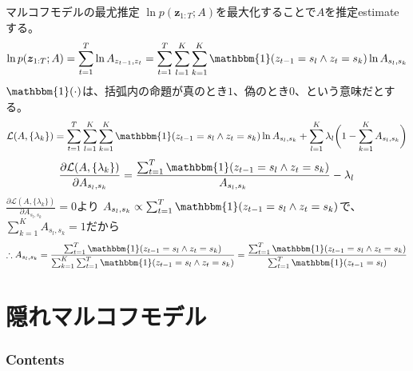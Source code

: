 \documentclass[aspectratio=169,unicode,dvipdfmx,14pt]{beamer}
\begin{document}
\begin{frame}{マルコフモデルの最尤推定}
\FontMath
$\ln p(\bm{z}_{1:T};A)$を最大化することで$A$を推定estimateする。
\begin{align}
\ln p(\bm{z}_{1:T};A) 
= \sum_{t=1}^T \ln A_{z_{t-1}, z_t}
= \sum_{t=1}^T \sum_{l=1}^K \sum_{k=1}^K \mathbbm{1}(z_{t-1}=s_l \wedge z_t=s_k) \ln A_{s_l,s_k}
\end{align}
$\mathbbm{1}(\cdot)$は、括弧内の命題が真のとき$1$、偽のとき$0$、という意味だとする。
\vspace{-0.05in}
\begin{align}
\mathcal{L}(A,\{ \lambda_k \}) = 
\sum_{t=1}^T \sum_{l=1}^K \sum_{k=1}^K \mathbbm{1}(z_{t-1}=s_l \wedge z_t=s_k) \ln A_{s_l,s_k}
+ \sum_{l=1}^K \lambda_l \bigg( 1 - \sum_{k=1}^K A_{s_l,s_k} \bigg) 
\end{align}
\vspace{-0.1in}
\begin{align}
\frac{\partial \mathcal{L}(A,\{ \lambda_k \})}{\partial A_{s_l,s_k}}
= \frac{ \sum_{t=1}^T \mathbbm{1}(z_{t-1}=s_l \wedge z_t=s_k) }{ A_{s_l,s_k} } - \lambda_l
\end{align}
$\frac{\partial \mathcal{L}(A,\{ \lambda_k \})}{\partial A_{s_l,s_k}} = 0$より
$A_{s_l,s_k} \propto \sum_{t=1}^T \mathbbm{1}(z_{t-1}=s_l \wedge z_t=s_k)$で、
$\sum_{k=1}^K A_{s_l,s_k}=1$だから
\begin{align}
\therefore A_{s_l,s_k} = \frac{ \sum_{t=1}^T \mathbbm{1}(z_{t-1}=s_l \wedge z_t=s_k) }
{ \sum_{k=1}^K \sum_{t=1}^T \mathbbm{1}(z_{t-1}=s_l \wedge z_t=s_k) }
= \frac{ \sum_{t=1}^T \mathbbm{1}(z_{t-1}=s_l \wedge z_t=s_k) }
{ \sum_{t=1}^T \mathbbm{1}(z_{t-1}=s_l) }
\end{align}
\end{frame}

\section{隠れマルコフモデル}

\begin{frame}\frametitle{Contents}
\Large \tableofcontents[currentsection]
\end{frame}
\end{document}
